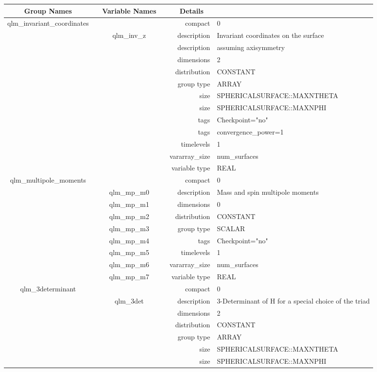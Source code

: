 \begin{tabular*}{150mm}{|c|c@{\extracolsep{\fill}}|rl|} \hline 
~ {\bf Group Names} ~ & ~ {\bf Variable Names} ~  &{\bf Details} ~ & ~ \\ 
\hline 
qlm\_invariant\_coordinates &  & compact & 0 \\ 
 & qlm\_inv\_z & description & Invariant coordinates on the surface \\ 
& ~ & description &  assuming axisymmetry \\ 
 &  & dimensions & 2 \\ 
 &  & distribution & CONSTANT \\ 
 &  & group type & ARRAY \\ 
 &  & size & SPHERICALSURFACE::MAXNTHETA \\ 
& ~ & size & SPHERICALSURFACE::MAXNPHI \\ 
 &  & tags & Checkpoint="no" \\ 
& ~ & tags & convergence\_power=1 \\ 
 &  & timelevels & 1 \\ 
 &  & vararray\_size & num\_surfaces \\ 
 &  & variable type & REAL \\ 
\hline 
qlm\_multipole\_moments &  & compact & 0 \\ 
 & qlm\_mp\_m0 & description & Mass and spin multipole moments \\ 
 & qlm\_mp\_m1 & dimensions & 0 \\ 
 & qlm\_mp\_m2 & distribution & CONSTANT \\ 
 & qlm\_mp\_m3 & group type & SCALAR \\ 
 & qlm\_mp\_m4 & tags & Checkpoint="no" \\ 
 & qlm\_mp\_m5 & timelevels & 1 \\ 
 & qlm\_mp\_m6 & vararray\_size & num\_surfaces \\ 
 & qlm\_mp\_m7 & variable type & REAL \\ 
\hline 
qlm\_3determinant &  & compact & 0 \\ 
 & qlm\_3det & description & 3-Determinant of H for a special choice of the triad \\ 
 &  & dimensions & 2 \\ 
 &  & distribution & CONSTANT \\ 
 &  & group type & ARRAY \\ 
 &  & size & SPHERICALSURFACE::MAXNTHETA \\ 
& ~ & size & SPHERICALSURFACE::MAXNPHI \\ 

\end{tabular*}

